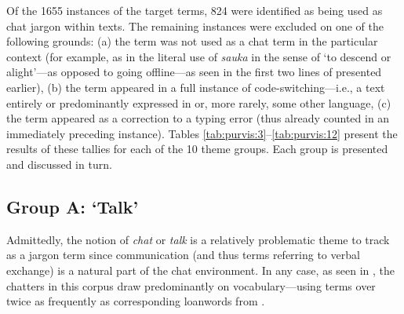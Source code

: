 \documentclass[output=paper
,newtxmath
,modfonts
,nonflat]{langsci/langscibook}
\begin{document}
Of the 1655 instances of the target terms, 824 were identified as being used as chat jargon within  texts. The remaining instances were excluded on one of the following grounds: (a) the term was not used as a chat term in the particular context (for example, as in the literal use of \textit{sauka} in the sense of ‘to descend or alight’—as opposed to going offline—as seen in the first two lines of  presented earlier), (b) the term appeared in a full instance of code-switching—i.e., a text entirely or predominantly expressed in  or, more rarely, some other language, (c) the term appeared as a correction to a typing error (thus already counted in an immediately preceding instance). Tables \ref{tab:purvis:3}--\ref{tab:purvis:12} present the results of these tallies for each of the 10 theme groups. Each group is presented and discussed in turn.

\subsection{Group A: ‘Talk’}

Admittedly, the notion of \textit{chat} or \textit{talk} is a relatively problematic theme to track as a jargon term since communication (and thus terms referring to verbal exchange) is a natural part of the chat environment. In any case, as seen in , the  chatters in this corpus draw predominantly on  vocabulary—using  terms over twice as frequently as corresponding loanwords from .
\end{document}
